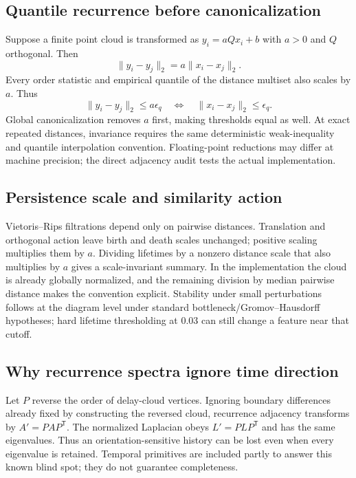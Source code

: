 \documentclass[10pt]{article}
\theoremstyle{definition}
\theoremstyle{remark}
\begin{document}
\subsection{Quantile recurrence before canonicalization}

Suppose a finite point cloud is transformed as $y_i=aQx_i+b$ with $a>0$ and $Q$ orthogonal. Then
\[
\|y_i-y_j\|_2=a\|x_i-x_j\|_2.
\]
Every order statistic and empirical quantile of the distance multiset also scales by $a$. Thus
\[
\|y_i-y_j\|_2\le a\epsilon_q
\quad\Longleftrightarrow\quad
\|x_i-x_j\|_2\le\epsilon_q.
\]
Global canonicalization removes $a$ first, making thresholds equal as well. At exact repeated distances, invariance requires the same deterministic weak-inequality and quantile interpolation convention. Floating-point reductions may differ at machine precision; the direct adjacency audit tests the actual implementation.

\subsection{Persistence scale and similarity action}

Vietoris--Rips filtrations depend only on pairwise distances. Translation and orthogonal action leave birth and death scales unchanged; positive scaling multiplies them by $a$. Dividing lifetimes by a nonzero distance scale that also multiplies by $a$ gives a scale-invariant summary. In the implementation the cloud is already globally normalized, and the remaining division by median pairwise distance makes the convention explicit. Stability under small perturbations follows at the diagram level under standard bottleneck/Gromov--Hausdorff hypotheses; hard lifetime thresholding at $0.03$ can still change a feature near that cutoff.

\subsection{Why recurrence spectra ignore time direction}

Let $P$ reverse the order of delay-cloud vertices. Ignoring boundary differences already fixed by constructing the reversed cloud, recurrence adjacency transforms by $A' = PAP^\mathsf T$. The normalized Laplacian obeys $L'=PLP^\mathsf T$ and has the same eigenvalues. Thus an orientation-sensitive history can be lost even when every eigenvalue is retained. Temporal primitives are included partly to answer this known blind spot; they do not guarantee completeness.
\end{document}
